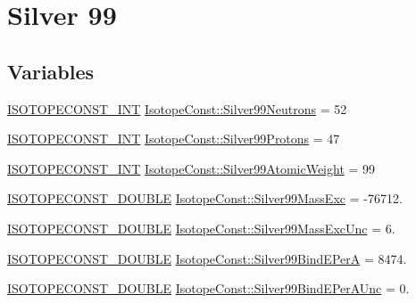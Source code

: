 \hypertarget{group___isotope_const-_silver-_ag99}{}\section{Silver 99}
\label{group___isotope_const-_silver-_ag99}
\subsection*{Variables}
\begin{DoxyCompactItemize}
\item 
\mbox{\hyperlink{group___isotope_const-_macros_ga5f18360b3e99483a35c32d789e62621c}{I\+S\+O\+T\+O\+P\+E\+C\+O\+N\+S\+T\+\_\+\+I\+NT}} \mbox{\hyperlink{group___isotope_const-_silver-_ag99_ga1f37562e0317aacb32773269c7a86977}{Isotope\+Const\+::\+Silver99\+Neutrons}} = 52
\item 
\mbox{\hyperlink{group___isotope_const-_macros_ga5f18360b3e99483a35c32d789e62621c}{I\+S\+O\+T\+O\+P\+E\+C\+O\+N\+S\+T\+\_\+\+I\+NT}} \mbox{\hyperlink{group___isotope_const-_silver-_ag99_gaff1b8aec6025a54c21419c6d7a81926d}{Isotope\+Const\+::\+Silver99\+Protons}} = 47
\item 
\mbox{\hyperlink{group___isotope_const-_macros_ga5f18360b3e99483a35c32d789e62621c}{I\+S\+O\+T\+O\+P\+E\+C\+O\+N\+S\+T\+\_\+\+I\+NT}} \mbox{\hyperlink{group___isotope_const-_silver-_ag99_ga24c24490a1f1d30aab586ed5a4d047a7}{Isotope\+Const\+::\+Silver99\+Atomic\+Weight}} = 99
\item 
\mbox{\hyperlink{group___isotope_const-_macros_ga8f45a7272ce02c0b4c65c44636ed719a}{I\+S\+O\+T\+O\+P\+E\+C\+O\+N\+S\+T\+\_\+\+D\+O\+U\+B\+LE}} \mbox{\hyperlink{group___isotope_const-_silver-_ag99_ga25b978eabc6729f42bc662c9abb966e1}{Isotope\+Const\+::\+Silver99\+Mass\+Exc}} = -\/76712.
\item 
\mbox{\hyperlink{group___isotope_const-_macros_ga8f45a7272ce02c0b4c65c44636ed719a}{I\+S\+O\+T\+O\+P\+E\+C\+O\+N\+S\+T\+\_\+\+D\+O\+U\+B\+LE}} \mbox{\hyperlink{group___isotope_const-_silver-_ag99_ga8f7823d5d70cf23c9dac03138f44d602}{Isotope\+Const\+::\+Silver99\+Mass\+Exc\+Unc}} = 6.
\item 
\mbox{\hyperlink{group___isotope_const-_macros_ga8f45a7272ce02c0b4c65c44636ed719a}{I\+S\+O\+T\+O\+P\+E\+C\+O\+N\+S\+T\+\_\+\+D\+O\+U\+B\+LE}} \mbox{\hyperlink{group___isotope_const-_silver-_ag99_gae600c8479af1afc71016d8355c645261}{Isotope\+Const\+::\+Silver99\+Bind\+E\+PerA}} = 8474.
\item 
\mbox{\hyperlink{group___isotope_const-_macros_ga8f45a7272ce02c0b4c65c44636ed719a}{I\+S\+O\+T\+O\+P\+E\+C\+O\+N\+S\+T\+\_\+\+D\+O\+U\+B\+LE}} \mbox{\hyperlink{group___isotope_const-_silver-_ag99_gacefb0caf1e31c8067af7b08019ad467d}{Isotope\+Const\+::\+Silver99\+Bind\+E\+Per\+A\+Unc}} = 0.

\end{DoxyCompactItemize}
